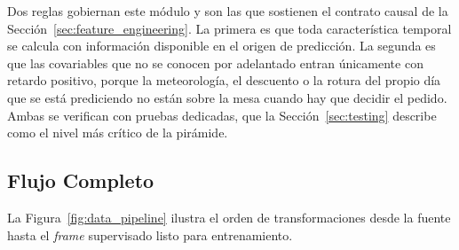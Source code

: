 Dos reglas gobiernan este módulo y son las que sostienen el contrato causal de la Sección~\ref{sec:feature_engineering}. La primera es que toda característica temporal se calcula con información disponible en el origen de predicción. La segunda es que las covariables que no se conocen por adelantado entran únicamente con retardo positivo, porque la meteorología, el descuento o la rotura del propio día que se está prediciendo no están sobre la mesa cuando hay que decidir el pedido. Ambas se verifican con pruebas dedicadas, que la Sección~\ref{sec:testing} describe como el nivel más crítico de la pirámide.

\subsection{Flujo Completo}

La Figura~\ref{fig:data_pipeline} ilustra el orden de transformaciones desde la fuente hasta el \textit{frame} supervisado listo para entrenamiento.

